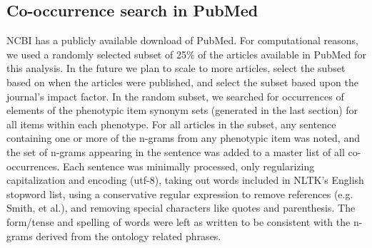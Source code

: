\documentclass{sig-alternate-05-2015}
\begin{document}

\subsection{Co-occurrence search in PubMed}

NCBI has a publicly available download of PubMed.
For computational reasons, we used a randomly selected subset of 25\% of the articles available in PubMed for this analysis. 
In the future we plan to scale to more articles, select the subset based on when the articles were published, and select the subset based upon the journal's impact factor.
In the random subset, we searched for occurrences of elements of the phenotypic item synonym sets (generated in the last section) for all items within each phenotype.
For all articles in the subset, any sentence containing one or more of the n-grams from any phenotypic item was noted, and the set of n-grams appearing in the sentence was added to a master list of all co-occurrences. 
Each sentence was minimally processed, only regularizing capitalization and encoding (utf-8), taking out words included in NLTK's English stopword list, using a conservative regular expression to remove references (e.g. Smith, et al.), and removing special characters like quotes and parenthesis. 
The form/tense and spelling of words were left as written to be consistent with the n-grams derived from the ontology related phrases.
\end{document}
